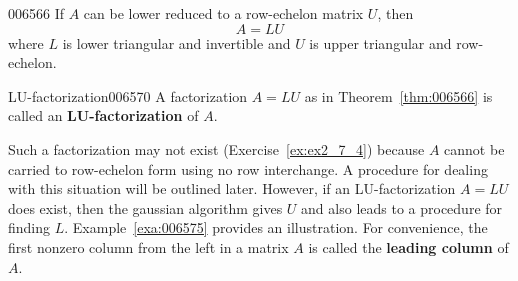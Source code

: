 \begin{theorem}{}{006566}
If $A$ can be lower reduced to a row-echelon matrix $U$, then
\begin{equation*}
A = LU
\end{equation*}
where $L$ is lower triangular and invertible and $U$ is upper triangular and row-echelon.
\end{theorem}

\begin{definition}{LU-factorization}{006570}
A factorization $A = LU$ as in Theorem~\ref{thm:006566} is called an \textbf{LU-factorization} of $A$.
\end{definition}

Such a factorization may not exist (Exercise~\ref{ex:ex2_7_4}) because $A$ cannot be carried to row-echelon form using no row interchange. A procedure for dealing with this situation will be outlined later. However, if an LU-factorization $A = LU$ does exist, then the gaussian algorithm gives $U$ and also leads to a procedure for finding $L$. Example~\ref{exa:006575} provides an illustration. For convenience, the first nonzero column from the left in a matrix $A$ is called the \textbf{leading column} of $A$.

